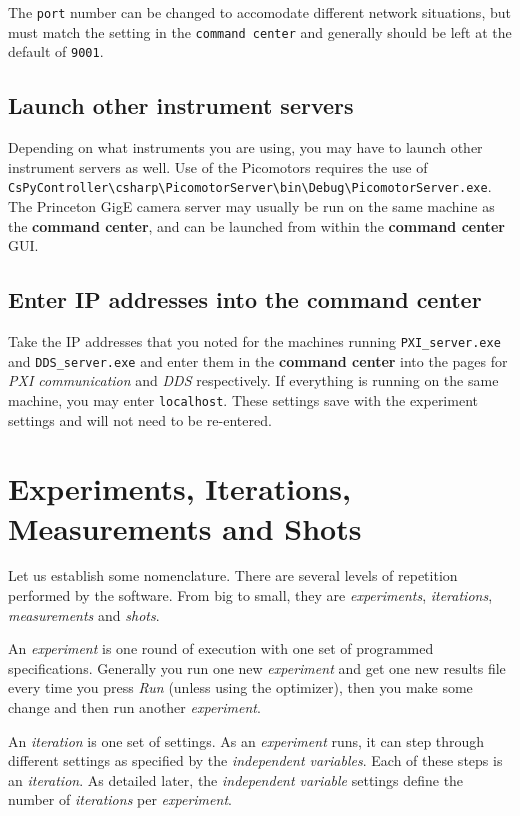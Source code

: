 \documentclass[pdftex,11pt,letterpaper]{article}
\begin{document}
The \texttt{port} number can be changed to accomodate different network situations, but must match the setting in the \texttt{command center} and generally should be left at the default of \texttt{9001}.

\subsection{Launch other instrument servers}

Depending on what instruments you are using, you may have to launch other instrument servers as well.  Use of the Picomotors requires the use of \texttt{CsPyController\textbackslash csharp\textbackslash PicomotorServer\textbackslash bin\textbackslash Debug\textbackslash PicomotorServer.exe}.  The Princeton GigE camera server may usually be run on the same machine as the \textbf{command center}, and can be launched from within the \textbf{command center} GUI.

\subsection{Enter IP addresses into the \textbf{command center}}

Take the IP addresses that you noted for the machines running \texttt{PXI\_server.exe} and \texttt{DDS\_server.exe} and enter them in the \textbf{command center} into the pages for \textit{PXI communication} and \textit{DDS} respectively.  If everything is running on the same machine, you may enter \texttt{localhost}.  These settings save with the experiment settings and will not need to be re-entered.

\section{Experiments, Iterations, Measurements and Shots}

Let us establish some nomenclature.  There are several levels of repetition performed by the software.  From big to small, they are \textit{experiments}, \textit{iterations}, \textit{measurements} and \textit{shots}.

An \textit{experiment} is one round of execution with one set of programmed specifications.  Generally you run one new \textit{experiment} and get one new results file every time you press \textit{Run} (unless using the optimizer), then you make some change and then run another \textit{experiment}.

An \textit{iteration} is one set of settings.  As an \textit{experiment} runs, it can step through different settings as specified by the \textit{independent variables}.  Each of these steps is an \textit{iteration}.  As detailed later, the \textit{independent variable} settings define the number of \textit{iterations} per \textit{experiment}.
\end{document}

